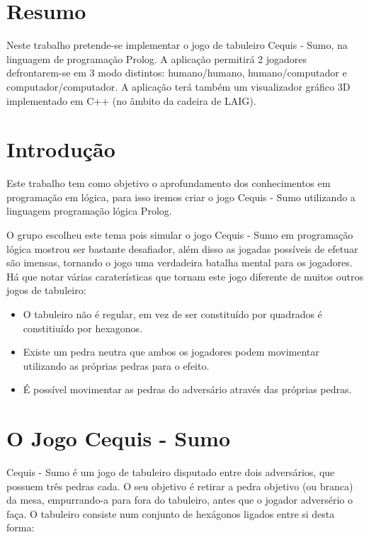 \documentclass[a4paper]{article}
\begin{document}
\section*{Resumo}
Neste trabalho pretende-se implementar o jogo de tabuleiro Cequis - Sumo, na linguagem de programação Prolog. A aplicação permitirá 2 jogadores defrontarem-se em 3 modo distintos: humano/humano, humano/computador e computador/computador. A aplicação terá também um visualizador gráfico 3D implementado em C++ (no âmbito da cadeira de LAIG).

\section{}
\tableofcontents

\newpage

\section{Introdução}
Este trabalho tem como objetivo o aprofundamento dos conhecimentos em programação em lógica, para isso iremos criar o jogo Cequis - Sumo utilizando a linguagem programação lógica Prolog.

O grupo escolheu este tema pois simular o jogo Cequis - Sumo em programação lógica mostrou ser bastante desafiador, além disso as jogadas possíveis de efetuar são imensas, tornando o jogo uma verdadeira batalha mental para os jogadores.
Há que notar várias caraterísticas que tornam este jogo diferente de muitos outros jogos de tabuleiro:

\begin{itemize}
\item O tabuleiro não é regular, em vez de ser constituído por quadrados é constitiuído por hexagonos.
\item Existe um pedra neutra que ambos os jogadores podem movimentar utilizando as próprias pedras para o efeito.
\item É possível movimentar as pedras do adversário através das próprias pedras.
\end{itemize}

\section{O Jogo Cequis - Sumo}

Cequis - Sumo é um jogo de tabuleiro disputado entre dois adversários, que possuem três pedras cada.
O seu objetivo é retirar a pedra objetivo (ou branca) da mesa, empurrando-a para fora do tabuleiro, antes que o jogador adversério o faça.
O tabuleiro consiste num conjunto de hexágonos ligados entre si desta forma: 
\end{document}
